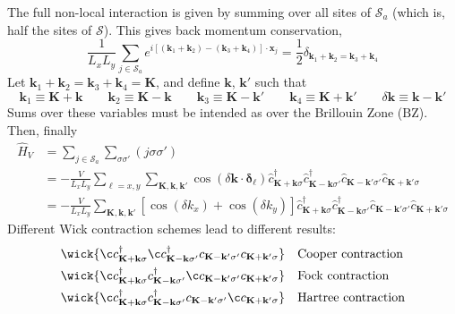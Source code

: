 The full non-local interaction is given by summing over all sites of $\mathcal{S}_a$ (which is, half the sites of $\mathcal{S}$). This gives back momentum conservation,
\[
	\frac{1}{L_xL_y} \sum_{j \in \mathcal{S}_a} e^{i \left[ (\mathbf{k}_1 + \mathbf{k}_2) - (\mathbf{k}_3 + \mathbf{k}_4) \right] \cdot \mathbf{x}_j} = \frac{1}{2} \delta_{\mathbf{k}_1 + \mathbf{k}_2 = \mathbf{k}_3 + \mathbf{k}_4}
\]
Let $\mathbf{k}_1 + \mathbf{k}_2 = \mathbf{k}_3 + \mathbf{k}_4 = \mathbf{K}$, and define $\mathbf{k}$, $\mathbf{k}'$ such that
\[
	\mathbf{k}_1 \equiv \mathbf{K} + \mathbf{k} 
	\qquad
	\mathbf{k}_2 \equiv \mathbf{K} - \mathbf{k} 
	\qquad
	\mathbf{k}_3 \equiv \mathbf{K} - \mathbf{k}' 
	\qquad
	\mathbf{k}_4 \equiv \mathbf{K} + \mathbf{k}'
	\qquad
	\delta \mathbf{k} \equiv \mathbf{k}-\mathbf{k}'
\]
Sums over these variables must be intended as over the Brillouin Zone ($\mathrm{BZ}$). Then, finally
\begin{align}
	\hat H_V &= \sum_{j \in \mathcal{S}_a} \sum_{\sigma\sigma'} (j\sigma\sigma') \nonumber \\
	&= - \frac{V}{L_x L_y} \sum_{\ell = x,y} \sum_{\mathbf{K}, \mathbf{k}, \mathbf{k}'} \cos\left(
		\delta \mathbf{k} \cdot \bm{\delta}_\ell
	\right)	\hat c_{\mathbf{K}+\mathbf{k} \sigma}^\dagger \hat c_{\mathbf{K}-\mathbf{k} \sigma'}^\dagger \hat c_{\mathbf{K}-\mathbf{k}' \sigma'} \hat c_{\mathbf{K}+\mathbf{k}'\sigma} \nonumber \\
	&= - \frac{V}{L_x L_y} \sum_{\mathbf{K}, \mathbf{k}, \mathbf{k}'} \left[
	\cos \left(
		\delta k_x
	\right)	+ \cos \left(
		\delta k_y
	\right)	
	\right]	\hat c_{\mathbf{K}+\mathbf{k} \sigma}^\dagger \hat c_{\mathbf{K}-\mathbf{k} \sigma'}^\dagger \hat c_{\mathbf{K}-\mathbf{k}' \sigma'} \hat c_{\mathbf{K}+\mathbf{k}'\sigma} \label{eq:reciprocal-space-non-local-interaction-explicit}
\end{align}
Different Wick contraction schemes lead to different results:
\begin{align}
	&\wick{
		\c
		c_{\mathbf{K}+\mathbf{k} \sigma}^\dagger 
		\c
		c_{\mathbf{K}-\mathbf{k} \sigma'}^\dagger c_{\mathbf{K}-\mathbf{k}' \sigma'} c_{\mathbf{K}+\mathbf{k}'\sigma}
	} &&\text{Cooper contraction} \label{eq:reciprocal-space-cooper-contraction} \\
	&\wick{
		\c
		c_{\mathbf{K}+\mathbf{k} \sigma}^\dagger 
		c_{\mathbf{K}-\mathbf{k} \sigma'}^\dagger
		\c
		c_{\mathbf{K}-\mathbf{k}' \sigma'} c_{\mathbf{K}+\mathbf{k}'\sigma}
	} &&\text{Fock contraction} \label{eq:reciprocal-space-fock-contraction} \\
	&\wick{
		\c
		c_{\mathbf{K}+\mathbf{k} \sigma}^\dagger 
		c_{\mathbf{K}-\mathbf{k} \sigma'}^\dagger c_{\mathbf{K}-\mathbf{k}' \sigma'}
		\c
		c_{\mathbf{K}+\mathbf{k}'\sigma}
	} &&\text{Hartree contraction} \label{eq:reciprocal-space-hartree-contraction}
\end{align}
